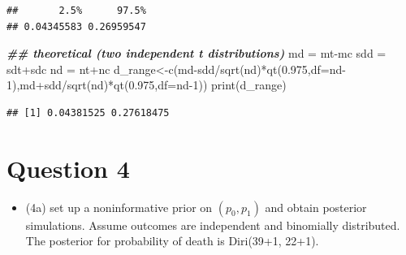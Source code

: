 \documentclass[
]{book}
\newenvironment{Shaded}{\begin{snugshade}}{\end{snugshade}}
\newcommand{\AttributeTok}[1]{\textcolor[rgb]{0.77,0.63,0.00}{#1}}
\newcommand{\DecValTok}[1]{\textcolor[rgb]{0.00,0.00,0.81}{#1}}
\newcommand{\DocumentationTok}[1]{\textcolor[rgb]{0.56,0.35,0.01}{\textbf{\textit{#1}}}}
\newcommand{\FloatTok}[1]{\textcolor[rgb]{0.00,0.00,0.81}{#1}}
\newcommand{\FunctionTok}[1]{\textcolor[rgb]{0.00,0.00,0.00}{#1}}
\newcommand{\NormalTok}[1]{#1}
\newcommand{\OtherTok}[1]{\textcolor[rgb]{0.56,0.35,0.01}{#1}}
\newcommand{\SpecialCharTok}[1]{\textcolor[rgb]{0.00,0.00,0.00}{#1}}
\providecommand{\tightlist}{%
  \setlength{\itemsep}{0pt}\setlength{\parskip}{0pt}}
\theoremstyle{definition}
\theoremstyle{definition}
\theoremstyle{definition}
\theoremstyle{definition}
\theoremstyle{remark}
\begin{document}
\begin{verbatim}
##       2.5%      97.5% 
## 0.04345583 0.26959547
\end{verbatim}

\begin{Shaded}
\begin{Highlighting}[]
  \DocumentationTok{\#\# theoretical (two independent t distributions)}
\NormalTok{  md }\OtherTok{=}\NormalTok{ mt}\SpecialCharTok{{-}}\NormalTok{mc}
\NormalTok{  sdd }\OtherTok{=}\NormalTok{ sdt}\SpecialCharTok{+}\NormalTok{sdc}
\NormalTok{  nd }\OtherTok{=}\NormalTok{ nt}\SpecialCharTok{+}\NormalTok{nc}
\NormalTok{  d\_range}\OtherTok{\textless{}{-}}\FunctionTok{c}\NormalTok{(md}\SpecialCharTok{{-}}\NormalTok{sdd}\SpecialCharTok{/}\FunctionTok{sqrt}\NormalTok{(nd)}\SpecialCharTok{*}\FunctionTok{qt}\NormalTok{(}\FloatTok{0.975}\NormalTok{,}\AttributeTok{df=}\NormalTok{nd}\DecValTok{{-}1}\NormalTok{),md}\SpecialCharTok{+}\NormalTok{sdd}\SpecialCharTok{/}\FunctionTok{sqrt}\NormalTok{(nd)}\SpecialCharTok{*}\FunctionTok{qt}\NormalTok{(}\FloatTok{0.975}\NormalTok{,}\AttributeTok{df=}\NormalTok{nd}\DecValTok{{-}1}\NormalTok{))}
  \FunctionTok{print}\NormalTok{(d\_range)}
\end{Highlighting}
\end{Shaded}

\begin{verbatim}
## [1] 0.04381525 0.27618475
\end{verbatim}

\hypertarget{question-4-1}{%
\section*{Question 4}\label{question-4-1}}

\begin{itemize}
\tightlist
\item
  (4a) set up a noninformative prior on \((p_0,p_1)\) and obtain posterior simulations. Assume outcomes are independent and binomially distributed. The posterior for probability of death is Diri(39+1, 22+1).
\end{itemize}
\end{document}
